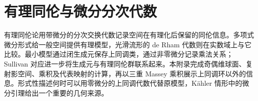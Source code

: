 
% 
% 
% 
% 
% 
% 
% 

\chapter{有理同伦与微分分次代数}
\label{g2:app:E}

\begin{chapterabstract}
	有理同伦论用带微分的分次交换代数记录空间在有理化后保留的同伦信息。多项式微分形式给一般空间提供有理模型，光滑流形的 de Rham 代数则在实数域上与它比较。最小模型通过闭生成元保存上同调类，通过非零微分记录乘法关系；Sullivan 对应进一步将生成元与有理同伦群联系起来。本附录完成奇偶维球面、复射影空间、乘积及代表映射的计算，再以三重 Massey 乘积展示上同调环以外的信息。形式性描述何时可以用零微分的上同调代数代替原模型，Kähler 情形中的微分引理给出一个重要的几何来源。
\end{chapterabstract}

